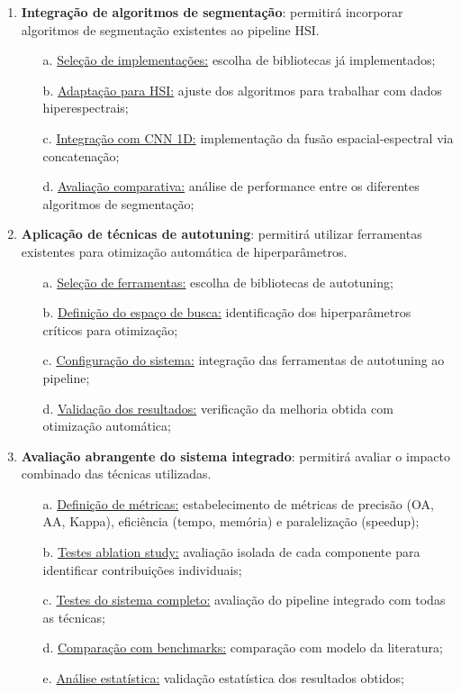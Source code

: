 \documentclass[a4paper,12pt,brazil]{article} %
\begin{document}
\begin{enumerate}
    \item \textbf{Integração de algoritmos de segmentação}: permitirá incorporar algoritmos de segmentação existentes ao pipeline HSI.
    \begin{enumerate}
        \item[a.] \underline{Seleção de implementações:} escolha de bibliotecas já implementados;
        \item[b.] \underline{Adaptação para HSI:} ajuste dos algoritmos para trabalhar com dados hiperespectrais;
        \item[c.] \underline{Integração com CNN 1D:} implementação da fusão espacial-espectral via concatenação;
        \item[d.] \underline{Avaliação comparativa:} análise de performance entre os diferentes algoritmos de segmentação;
    \end{enumerate}
    
    \item \textbf{Aplicação de técnicas de autotuning}: permitirá utilizar ferramentas existentes para otimização automática de hiperparâmetros.
    \begin{enumerate}
        \item[a.] \underline{Seleção de ferramentas:} escolha de bibliotecas de autotuning;
        \item[b.] \underline{Definição do espaço de busca:} identificação dos hiperparâmetros críticos para otimização;
        \item[c.] \underline{Configuração do sistema:} integração das ferramentas de autotuning ao pipeline;
        \item[d.] \underline{Validação dos resultados:} verificação da melhoria obtida com otimização automática;
    \end{enumerate}
    
    \item \textbf{Avaliação abrangente do sistema integrado}: permitirá avaliar o impacto combinado das técnicas utilizadas.
    \begin{enumerate}
        \item[a.] \underline{Definição de métricas:} estabelecimento de métricas de precisão (OA, AA, Kappa), eficiência (tempo, memória) e paralelização (speedup);
        \item[b.] \underline{Testes ablation study:} avaliação isolada de cada componente para identificar contribuições individuais;
        \item[c.] \underline{Testes do sistema completo:} avaliação do pipeline integrado com todas as técnicas;
        \item[d.] \underline{Comparação com benchmarks:} comparação com modelo da literatura;
        \item[e.] \underline{Análise estatística:} validação estatística dos resultados obtidos;
    \end{enumerate}
    

\end{enumerate}
\end{document}
